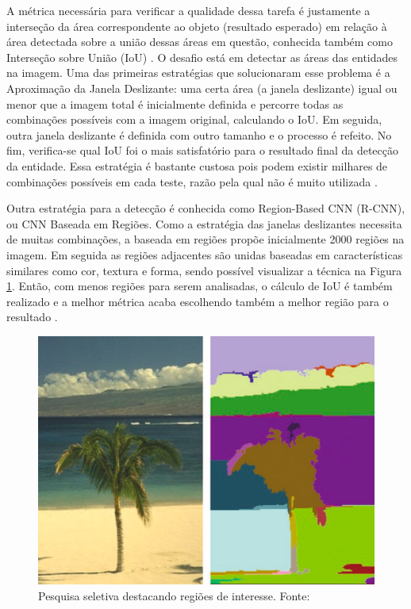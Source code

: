 A métrica necessária para verificar a qualidade dessa tarefa é justamente a interseção da área correspondente ao objeto (resultado esperado) em relação à área detectada sobre a união dessas áreas em questão, conhecida também como Interseção sobre União (IoU) \cite{Chollet:2017}. O desafio está em detectar as áreas das entidades na imagem. Uma das primeiras estratégias que solucionaram esse problema é a Aproximação da Janela Deslizante: uma certa área (a janela deslizante) igual ou menor que a imagem total é inicialmente definida e percorre todas as combinações possíveis com a imagem original, calculando o IoU. Em seguida, outra janela deslizante é definida com outro tamanho e o processo é refeito. No fim, verifica-se qual IoU foi o mais satisfatório para o resultado final da detecção da entidade. Essa estratégia é bastante custosa pois podem existir milhares de combinações possíveis em cada teste, razão pela qual não é muito utilizada \cite{Michelucci:2019}.

Outra estratégia para a detecção é conhecida como Region-Based CNN (R-CNN), ou CNN Baseada em Regiões. Como a estratégia das janelas deslizantes necessita de muitas combinações, a baseada em regiões propõe inicialmente 2000 regiões na imagem. Em seguida as regiões adjacentes são unidas baseadas em características similares como cor, textura e forma, sendo possível visualizar a técnica na Figura \ref{fig:selective-search}. Então, com menos regiões para serem analisadas, o cálculo de IoU é também realizado e a melhor métrica acaba escolhendo também a melhor região para o resultado \cite{Michelucci:2019}.

\begin{figure}[H]
    \centering
    \includegraphics[width=.7\textwidth]{img/selective-search.png}
    \caption{Pesquisa seletiva destacando regiões de interesse. Fonte: \cite{Michelucci:2019}}
    \label{fig:selective-search}
\end{figure}

